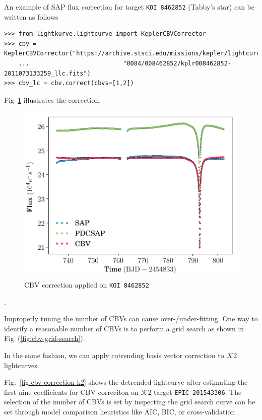 \documentclass{article}
\begin{document}
An example of SAP flux correction for target \texttt{KOI 8462852}
(Tabby's star) can be written as follows
\begin{verbatim}
>>> from lightkurve.lightcurve import KeplerCBVCorrector
>>> cbv = KeplerCBVCorrector("https://archive.stsci.edu/missions/kepler/lightcurves/"
    ...                          "0084/008462852/kplr008462852-2011073133259_llc.fits")
>>> cbv_lc = cbv.correct(cbvs=[1,2])
\end{verbatim}

Fig~\ref{fig:cbv-correction} illustrates the correction.

\begin{figure}[!htb]
    \centering
    \includegraphics[scale=.5]{figs/cbv.pdf}
    \caption{CBV correction applied on \texttt{KOI 8462852}}
    \label{fig:cbv-correction}
\end{figure}

\cite{2014sdmm.book.....I}.

Improperly tuning the number of CBVs can cause over-/under-fitting. One
way to identify a reasonable number of CBVs is to perform a grid search
as shown in Fig~(\ref{fig:cbv-grid-search}).

In the same fashion, we can apply cotrending basis vector correction to
$\mathcal{K}\mathit{2}$ lightcurves.

Fig.~\ref{fig:cbv-correction-k2} shows the detrended lightcurve after estimating
the first nine coefficients for CBV correciton on $\mathcal{K}\mathit{2}$ target
 \texttt{EPIC 201543306}. The selection of the number of CBVs is set by inspecting the
grid search curve can be set through model comparison heuristics like AIC, BIC,
or cross-validation \cite{2014sdmm.book.....I}.
\end{document}
